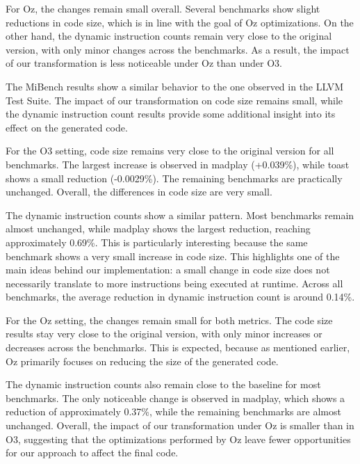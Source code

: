 For Oz, the changes remain small overall. Several benchmarks show slight reductions in code size, which is in line with the goal of Oz optimizations. On the other hand, the dynamic instruction counts remain very close to the original version, with only minor changes across the benchmarks. As a result, the impact of our transformation is less noticeable under Oz than under O3.






The MiBench results show a similar behavior to the one observed in the LLVM Test Suite. The impact of our transformation on code size remains small, while the dynamic instruction count results provide some additional insight into its effect on the generated code.

For the O3 setting, code size remains very close to the original version for all benchmarks. The largest increase is observed in madplay (+0.039\%), while toast shows a small reduction (-0.0029\%). The remaining benchmarks are practically unchanged. Overall, the differences in code size are very small.

The dynamic instruction counts show a similar pattern. Most benchmarks remain almost unchanged, while madplay shows the largest reduction, reaching approximately 0.69\%. This is particularly interesting because the same benchmark shows a very small increase in code size. This highlights one of the main ideas behind our implementation: a small change in code size does not necessarily translate to more instructions being executed at runtime. Across all benchmarks, the average reduction in dynamic instruction count is around 0.14\%.

For the Oz setting, the changes remain small for both metrics. The code size results stay very close to the original version, with only minor increases or decreases across the benchmarks. This is expected, because as mentioned earlier, Oz primarily focuses on reducing the size of the generated code.

The dynamic instruction counts also remain close to the baseline for most benchmarks. The only noticeable change is observed in madplay, which shows a reduction of approximately 0.37\%, while the remaining benchmarks are almost unchanged. Overall, the impact of our transformation under Oz is smaller than in O3, suggesting that the optimizations performed by Oz leave fewer opportunities for our approach to affect the final code.
